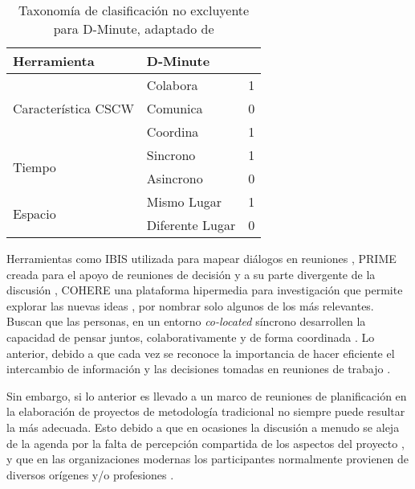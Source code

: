 \begin{table}[t]
\centering
\caption{ Taxonomía de clasificación no excluyente para D-Minute, adaptado de }\newline\newline
\label{tab:taxonomia}
\begin{tabular}{@{}lll@{}}
\toprule
Herramienta & \multicolumn{2}{l}{D-Minute} \\ \midrule
\multicolumn{1}{|c|}{\multirow{3}{*}{Característica CSCW}} & \multicolumn{1}{l|}{Colabora} & \multicolumn{1}{l|}{1} \\ \cmidrule(l){2-3} 
\multicolumn{1}{|c|}{} & \multicolumn{1}{l|}{Comunica} & \multicolumn{1}{l|}{0} \\ \cmidrule(l){2-3} 
\multicolumn{1}{|c|}{} & \multicolumn{1}{l|}{Coordina} & \multicolumn{1}{l|}{1} \\ \midrule
\multicolumn{1}{|l|}{\multirow{2}{*}{Tiempo}} & \multicolumn{1}{l|}{Sincrono} & \multicolumn{1}{l|}{1} \\ \cmidrule(l){2-3} 
\multicolumn{1}{|l|}{} & \multicolumn{1}{l|}{Asincrono} & \multicolumn{1}{l|}{0} \\ \midrule
\multicolumn{1}{|l|}{\multirow{2}{*}{Espacio}} & \multicolumn{1}{l|}{Mismo Lugar} & \multicolumn{1}{l|}{1} \\ \cmidrule(l){2-3} 
\multicolumn{1}{|l|}{} & Diferente Lugar & 0 \\ \bottomrule
\end{tabular}
\end{table}

Herramientas como IBIS utilizada para mapear diálogos en reuniones , PRIME creada para el apoyo de reuniones de decisión y a su parte divergente de la discusión , COHERE una plataforma hipermedia para investigación que permite explorar las nuevas ideas , por nombrar solo algunos de los más relevantes. Buscan que las personas, en un entorno \textit{co-located} síncrono desarrollen la capacidad de pensar juntos, colaborativamente y de forma coordinada .  Lo anterior, debido a que cada vez se reconoce la importancia de hacer eficiente el intercambio de información y las decisiones tomadas en reuniones de trabajo .


Sin embargo, si lo anterior es llevado a un marco de reuniones de planificación en la elaboración de proyectos de metodología tradicional no siempre puede resultar la más adecuada. Esto debido a que en ocasiones la discusión a menudo se aleja de la agenda por la falta de percepción compartida de los aspectos del proyecto , y que en las organizaciones modernas los participantes normalmente provienen de diversos orígenes y/o profesiones . 


